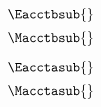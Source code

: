 

\begin{landscape}

\linespread{1}


\sectionsep{}

{
\begin{equation}
  \Eacctbsub{}
\end{equation}
}
{
\begin{equation} \label{eq:before_substitution_financial}
  \Macctbsub{}
\end{equation}
}

\sectionsep{}


{
\begin{equation}
  \Eacctasub{}
\end{equation}
}
{
\begin{equation}
  \Macctasub{}
\end{equation}
}

\sectionsep{}

\derivsection{}
{
~
  
}
\end{landscape}
